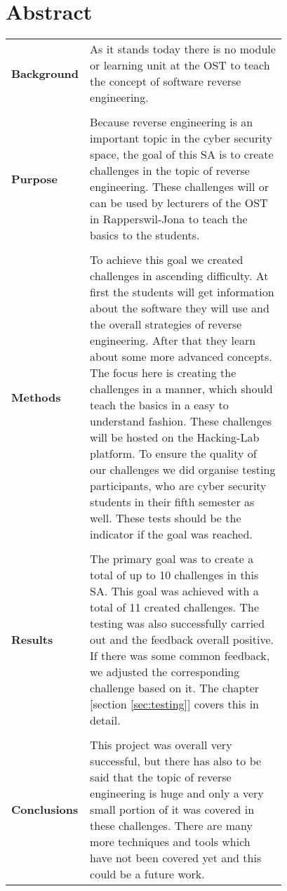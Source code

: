 \chapter{Abstract}
\begin{table}[H]
    \begin{tabular}{lp{0.78\linewidth}}
    \textbf{Background} & As it stands today there is no module or learning unit at the OST to teach the concept of software reverse engineering. \\
    \\
    \textbf{Purpose}    & Because reverse engineering is an important topic in the cyber security space, the goal of this SA is to create challenges in the topic of reverse engineering. These challenges will or can be used by lecturers of the OST in Rapperswil-Jona to teach the basics to the students. \\
    \\
    \textbf{Methods}    & To achieve this goal we created challenges in ascending difficulty. At first the students will get information about the software they will use and the overall strategies of reverse engineering. After that they learn about some more advanced concepts. The focus here is creating the challenges in a manner, which should teach the basics in a easy to understand fashion. These challenges will be hosted on the Hacking-Lab platform. To ensure the quality of our challenges we did organise testing participants, who are cyber security students in their fifth semester as well. These tests should be the indicator if the goal was reached. \\
    \\
    \textbf{Results}    & The primary goal was to create a total of up to 10 challenges in this SA. This goal was achieved with a total of 11 created challenges. The testing was also successfully carried out and the feedback overall positive. If there was some common feedback, we adjusted the corresponding challenge based on it. The chapter [section \ref{sec:testing}] covers this in detail. \\
    \\
    \textbf{Conclusions} & This project was overall very successful, but there has also to be said that the topic of reverse engineering is huge and only a very small portion of it was covered in these challenges. There are many more techniques and tools which have not been covered yet and this could be a future work. 
    \end{tabular}
\end{table}

